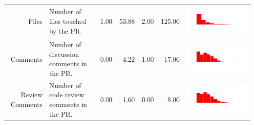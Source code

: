 \begin{table}[ht]
\begin{tabular}{rp{26em}rrrrc}
    Files & Number of files touched by the PR. & 1.00 & 53.88 & 2.00 & 125.00 & \includegraphics[scale = 0.1, clip = true, trim= 50px 60px 50px 60px]{../figs/hist-features/hist-files.pdf} \\
    Comments & Number of discussion comments in the PR. & 0.00 & 4.22 & 1.00 & 17.00 & \includegraphics[scale = 0.1, clip = true, trim= 50px 60px 50px 60px]{../figs/hist-features/hist-comments.pdf} \\
    Review Comments & Number of code review comments in the PR. & 0.00 & 1.60 & 0.00 & 8.00 & \includegraphics[scale = 0.1, clip = true, trim= 50px 60px 50px 60px]{../figs/hist-features/hist-reviewComments.pdf} \\

\end{tabular}
\end{table}

